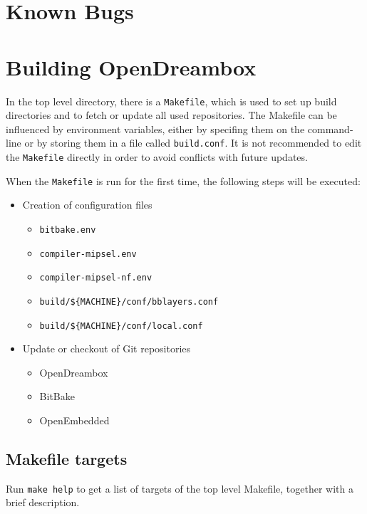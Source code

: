 \documentclass[a4paper]{article}
\newcommand{\shell}[1]{\texttt{\small #1}}
\begin{document}
\section{Known Bugs}

\pagebreak

\section{Building OpenDreambox}

  In the top level directory, there is a \shell{Makefile}, which is used to
  set up build directories and to fetch or update all used repositories.
  The Makefile can be influenced by environment variables, either
  by specifing them on the command-line or by storing them in a file called
  \shell{build.conf}. It is not recommended to edit the \shell{Makefile} directly
  in order to avoid conflicts with future updates.

  When the \shell{Makefile} is run for the first time, the following steps will
  be executed:

  \begin{itemize}
    \item Creation of configuration files
      \begin{itemize}
        \item \shell{bitbake.env}
        \item \shell{compiler-mipsel.env}
        \item \shell{compiler-mipsel-nf.env}
        \item \shell{build/\$\{MACHINE\}/conf/bblayers.conf}
        \item \shell{build/\$\{MACHINE\}/conf/local.conf}
      \end{itemize}
    \item Update or checkout of Git repositories
      \begin{itemize}
        \item OpenDreambox
        \item BitBake
        \item OpenEmbedded
      \end{itemize}
  \end{itemize}

  \subsection{Makefile targets}
    Run \shell{make help} to get a list of targets of the top level Makefile, together with a brief description.
\end{document}
